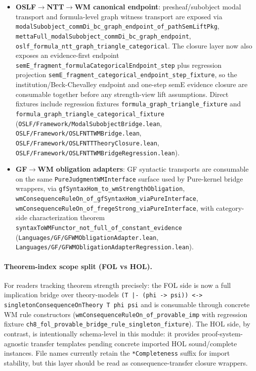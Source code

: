 \documentclass[]{article}
\newcommand{\code}[1]{\texttt{#1}}
\begin{document}
\begin{itemize}[leftmargin=2em]
  multiset consequence transport, and categorical-surface wrappers.
\item \textbf{OSLF$\rightarrow$NTT$\rightarrow$WM canonical endpoint}: presheaf/subobject
  modal transport and formula-level graph witness transport are exposed via
  \code{modalSubobject\_commDi\_bc\_graph\_endpoint\_of\_pathSemLiftPkg},
  \code{mettaFull\_modalSubobject\_commDi\_bc\_graph\_endpoint},
  \code{oslf\_formula\_ntt\_graph\_triangle\_categorical}. The closure layer
  now also exposes an evidence-first endpoint
  \code{semE\_fragment\_formulaCategoricalEndpoint\_step} plus regression
  projection
  \code{semE\_fragment\_categorical\_endpoint\_step\_fixture}, so the
  institution/Beck-Chevalley endpoint and one-step semE evidence closure are
  consumable together before any strength-view lift assumptions. Direct
  fixtures include
  regression fixtures
  \code{formula\_graph\_triangle\_fixture} and
  \code{formula\_graph\_triangle\_categorical\_fixture}
  (\code{OSLF/Framework/ModalSubobjectBridge.lean},
   \code{OSLF/Framework/OSLFNTTWMBridge.lean},
   \code{OSLF/Framework/OSLFNTTTheoryClosure.lean},
   \code{OSLF/Framework/OSLFNTTWMBridgeRegression.lean}).
\item \textbf{GF$\rightarrow$WM obligation adapters}:
  GF syntactic transports are consumable on the same
  \code{PureJudgmentWMInterface} surface used by Pure-kernel bridge wrappers,
  via
  \code{gfSyntaxHom\_to\_wmStrengthObligation},
  \code{wmConsequenceRuleOn\_of\_gfSyntaxHom\_viaPureInterface},
  \code{wmConsequenceRuleOn\_of\_fregeStrong\_viaPureInterface}, with
  category-side characterization theorem
  \code{syntaxToWMFunctor\_not\_full\_of\_constant\_evidence}
  (\code{Languages/GF/GFWMObligationAdapter.lean},
   \code{Languages/GF/GFWMObligationAdapterRegression.lean}).
\end{itemize}

\paragraph{Theorem-index scope split (FOL vs HOL).}
For readers tracking theorem strength precisely: the FOL side is now a full
implication bridge over theory-models
\code{(T |- (phi -> psi)) <-> singletonConsequenceOnTheory T phi psi}
and is consumable through concrete WM rule constructors
(\code{wmConsequenceRuleOn\_of\_provable\_imp} with regression fixture
\code{ch8\_fol\_provable\_bridge\_rule\_singleton\_fixture}). The HOL side, by
contrast, is intentionally schema-level in this module: it provides
proof-system-agnostic transfer templates pending concrete imported HOL
sound/complete instances. File names currently retain the
\code{*Completeness} suffix for import stability, but this layer should be
read as consequence-transfer closure wrappers.
\end{document}
